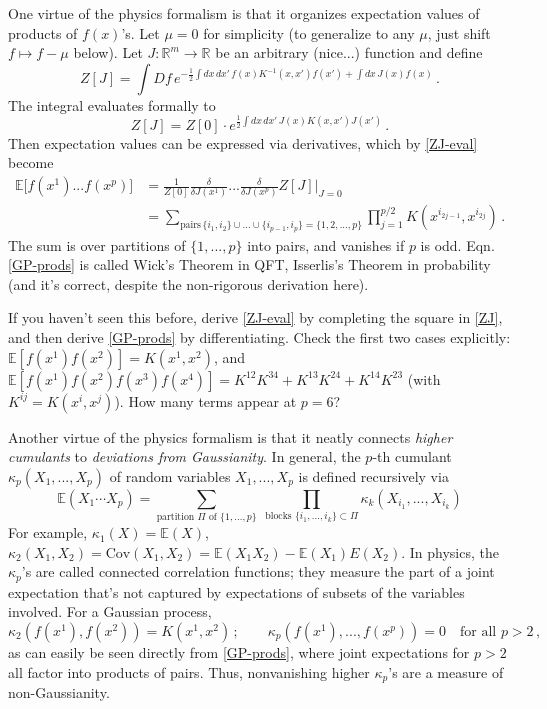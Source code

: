 \documentclass[11pt]{article}
\newcommand{\R}{\mathbb{R}}
\newcommand{\E}{\mathbb{E}}
\begin{document}
One virtue of the physics formalism is that it organizes expectation values of products of $f(x)$'s. Let $\mu=0$ for simplicity (to generalize to any $\mu$, just shift $f\mapsto f-\mu$ below). Let $J:\R^m\to \R$ be an arbitrary (nice...) function and define
%
\begin{equation} Z[J] = \int Df\, e^{\textstyle -\frac{1}{2}\int dx\,dx'\, f(x)K^{-1}(x,x')f(x') + \int dx\, J(x)f(x)}\,. \label{ZJ}\end{equation}
%
The integral evaluates formally to
%
\begin{equation} Z[J] = Z[0] \cdot e^{\textstyle \frac{1}{2} \int dx\,dx'\, J(x) K(x,x') J(x')}\,. \label{ZJ-eval} \end{equation}
%
Then expectation values can be expressed via derivatives, which by \eqref{ZJ-eval} become
%
\begin{align} \E\big[ f(x^1)...f(x^p)\big] &= \frac{1}{Z[0]} \frac{\delta}{\delta J(x^1)}...\frac{\delta}{\delta J(x^p)} Z[J]\bigg|_{J=0} \\ &= \sum_{\text{pairs}\,\{i_1,i_2\}\cup...\cup\{i_{p-1},i_p\}=\{1,2,...,p\}}  \prod_{j=1}^{p/2} K(x^{i_{2j-1}},x^{i_{2j}})\,. \label{GP-prods}
\end{align}
%
The sum is over partitions of $\{1,...,p\}$ into pairs, and vanishes if $p$ is odd. Eqn. \eqref{GP-prods} is called Wick's Theorem in QFT, Isserlis's Theorem in probability (and it's correct, despite the non-rigorous derivation here).

\begin{exercise}
\label{ex:wick}
If you haven't seen this before, derive \eqref{ZJ-eval} by completing the square in \eqref{ZJ}, and then derive \eqref{GP-prods} by differentiating. Check the first two cases explicitly: $\E[f(x^1)f(x^2)] = K(x^1,x^2)$, and $\E[f(x^1)f(x^2)f(x^3)f(x^4)] = K^{12}K^{34}+K^{13}K^{24}+K^{14}K^{23}$ (with $K^{ij}=K(x^i,x^j)$). How many terms appear at $p=6$?
\end{exercise}

Another virtue of the physics formalism is that it neatly connects \emph{higher cumulants} to \emph{deviations from Gaussianity}. In general, the $p$-th cumulant $\kappa_p(X_1,...,X_p)$ of random variables $X_1,...,X_p$ is defined recursively via
%
\begin{equation} \E(X_1\cdots X_p) = \sum_{\text{partition $\Pi$ of $\{1,...,p\}$}} \;\prod_{\text{blocks $\{i_1,...,i_k\}\subset \Pi$}} \kappa_k(X_{i_1},...,X_{i_k})   \end{equation}
%
For example, $\kappa_1(X)=\E(X)$, $\kappa_2(X_1,X_2)=\text{Cov}(X_1,X_2) = \E(X_1X_2)-\E(X_1)E(X_2)$. In physics, the $\kappa_p$'s are called connected correlation functions; they measure the part of a joint expectation that's not captured by expectations of subsets of the variables involved. For a Gaussian process,
%
\begin{equation} \kappa_2(f(x^1),f(x^2))=K(x^1,x^2)\,;\qquad \kappa_p(f(x^1),...,f(x^p)) = 0\quad\text{for all $p>2$}\,, \end{equation}
%
as can easily be seen directly from \eqref{GP-prods}, where joint expectations for $p>2$ all factor into products of pairs. Thus, nonvanishing higher $\kappa_p$'s are a measure of non-Gaussianity.
\end{document}
